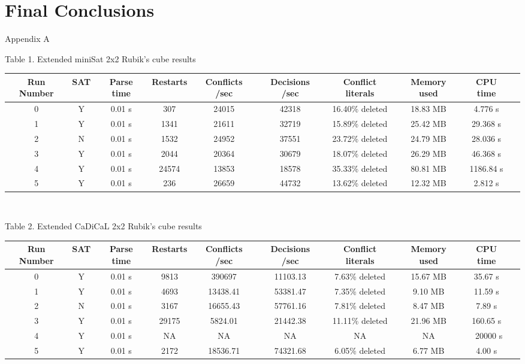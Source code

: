 \documentclass{article}
\begin{document}
\newpage

\section{Final Conclusions}


\pagebreak
\begin{center}
Appendix A
\end{center}

\begin{center}
Table 1. Extended miniSat 2x2 Rubik's cube results \\[1mm]
\end{center}
\begin{adjustwidth}{-3.5cm}{}
\begin{tabular}{|c|c|c|c|c|c|c|c|c|c|}
\hline
Run Number & SAT & Parse time & Restarts & Conflicts /sec & Decisions /sec & Conflict literals & Memory used & CPU time \\
\hline
0 & Y & 0.01 s & 307 & 24015 & 42318 & 16.40\% deleted & 18.83 MB & 4.776 s \\
\hline
1 & Y & 0.01 s & 1341 & 21611 & 32719 & 15.89\% deleted & 25.42 MB & 29.368 s \\
\hline
2 & N & 0.01 s & 1532 & 24952 & 37551 & 23.72\% deleted & 24.79 MB & 28.036 s \\
\hline
3 & Y & 0.01 s & 2044 & 20364 & 30679 & 18.07\% deleted &  26.29 MB & 46.368 s \\
\hline
4 & Y & 0.01 s & 24574 & 13853 & 18578 & 35.33\% deleted & 80.81 MB & 1186.84 s \\
\hline
5 & Y & 0.01 s & 236 & 26659 & 44732 & 13.62\% deleted & 12.32 MB & 2.812 s \\
\hline
\end{tabular} \\[3mm]
\end{adjustwidth}

\begin{center}
Table 2. Extended CaDiCaL 2x2 Rubik's cube results \\[1mm]
\end{center}
\begin{adjustwidth}{-3.5cm}{}
\begin{tabular}{|c|c|c|c|c|c|c|c|c|c|}
\hline
Run Number & SAT & Parse time & Restarts & Conflicts /sec & Decisions /sec & Conflict literals & Memory used & CPU time \\
\hline
0 & Y & 0.01 s & 9813 & 390697 & 11103.13 & 7.63\% deleted & 15.67 MB & 35.67 s \\
\hline
1 & Y & 0.01 s & 4693 & 13438.41 & 53381.47 & 7.35\% deleted & 9.10 MB & 11.59 s \\
\hline
2 & N & 0.01 s & 3167 & 16655.43 & 57761.16 & 7.81\% deleted & 8.47 MB & 7.89 s \\
\hline
3 & Y & 0.01 s & 29175 & 5824.01 & 21442.38 & 11.11\% deleted & 21.96 MB & 160.65 s \\
\hline
4 & Y & 0.01 s & NA & NA & NA & NA & NA & $\>$ 20000 s \\
\hline
5 & Y & 0.01 s & 2172 & 18536.71 & 74321.68 & 6.05\% deleted & 6.77 MB & 4.00 s \\
\hline
\end{tabular}
\end{adjustwidth}
\end{document}
